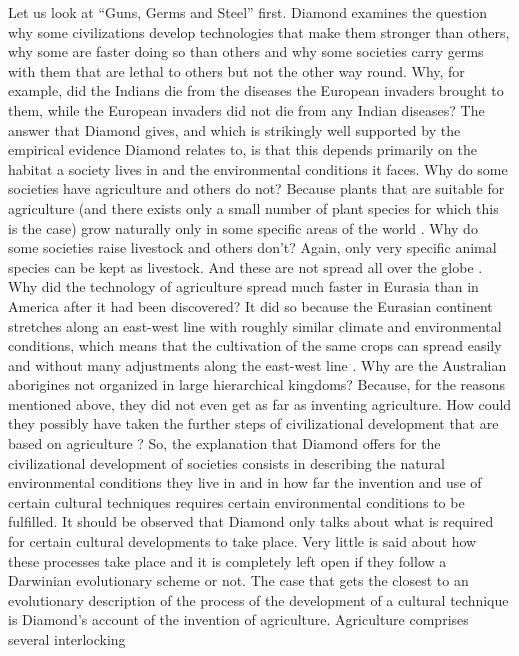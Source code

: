 Let us look at ``Guns, Germs and Steel'' first. Diamond examines the
question why some civilizations develop technologies that make them
stronger than others, why some are faster doing so than others and why
some societies carry germs with them that are lethal to others but not
the other way round. Why, for example, did the Indians die from the
diseases the European invaders brought to them, while the European
invaders did not die from any Indian diseases?  The answer that
Diamond gives, and which is strikingly well supported by the empirical
evidence Diamond relates to, is that this depends primarily on the
habitat a society lives in and the environmental conditions it
faces. Why do some societies have agriculture and others do not?
Because plants that are suitable for agriculture (and there exists
only a small number of plant species for which this is the case) grow
naturally only in some specific areas of the world
\cite[p.\ 131ff.]{diamond:1997}. Why do some societies raise livestock
and others don't? Again, only very specific animal species can be kept
as livestock. And these are not spread all over the globe
\cite[p.\ 157ff.]{diamond:1997}. Why did the technology of agriculture
spread much faster in Eurasia than in America after it had been
discovered? It did so because the Eurasian continent stretches along
an east-west line with roughly similar climate and environmental
conditions, which means that the cultivation of the same crops can
spread easily and without many adjustments along the east-west line
\cite[p.\ 176ff.]{diamond:1997}.  Why are the Australian aborigines not
organized in large hierarchical kingdoms? Because, for the reasons
mentioned above, they did not even get as far as inventing
agriculture. How could they possibly have taken the further steps of
civilizational development that are based on agriculture
\cite[p.\ 295ff.]{diamond:1997}? So, the explanation that Diamond
offers for the civilizational development of societies consists in
describing the natural environmental conditions they live in and in
how far the invention and use of certain cultural techniques requires
certain environmental conditions to be fulfilled. It should be
observed that Diamond only talks about what is required for certain
cultural developments to take place. Very little is said about how
these processes take place and it is completely left open if they
follow a Darwinian evolutionary scheme or not.  The case that gets the
closest to an evolutionary description of the process of the
development of a cultural technique is Diamond's account of the
invention of agriculture.  Agriculture comprises several interlocking
